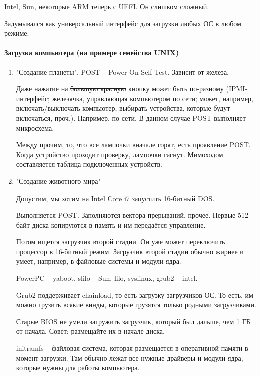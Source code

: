 \documentclass[a4paper,10pt]{article}
\begin{document}
Intel, Sun, некоторые ARM теперь с UEFI. Он слишком сложный.

Задумывался как универсальный интерфейс для загрузки любых ОС в любом режиме.

\paragraph{Загрузка компьютера (на примере семейства UNIX)}
\begin{enumerate}
\item "Создание планеты".
POST -- Power-On Self Test. Зависит от железа.

Даже нажатие на \sout{большую красную} кнопку может быть по-разному (IPMI-интерфейс; железячка, управляющая компьютером по сети; может, например, включать/выключать компьютер, выбирать устройства, которые будут включаться, проч.). Например, по сети.
В данном случае POST выполняет микросхема.

Между прочим, то, что все лампочки вначале горят, есть проявление POST. Когда устройство проходит проверку, лампочки гаснут. Мимоходом составляется таблица подключенных устройств.

\item "Создание животного мира"

Допустим, мы хотим на Intel Core i7 запустить 16-битный DOS.

Выполняется POST. Заполняются вектора прерываний, прочее. Первые 512 байт диска копируются в память и им передаётся управление. 

Потом ищется загрузчик второй стадии. Он уже может переключить процессор в 16-битный режим. Загрузчик второй стадии обычно жирнее и умеет, например, в файловые системы и модули ядра.

PowerPC -- yaboot, slilo -- Sun, lilo, syslinux, grub2 -- intel.

Grub2 поддерживает chainload, то есть загрузку загрузчиков ОС. То есть, им можно грузить всякие винды, которые грузятся только родными загрузчиками.

Старые BIOS не умели загружить загрузчик, который был дальше, чем 1 ГБ от начала. Совет: размещайте их в начале диска.

initramfs -- файловая система, которая размещается в оперативной памяти в момент загрузки. Там обычно лежат все нужные драйверы и модули ядра, которые нужны для работы компьютера.


\end{enumerate}
\end{document}
